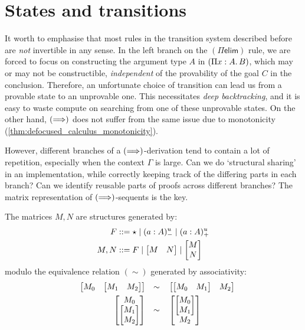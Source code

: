 \documentclass[twoside]{report}
\begin{document}
\section{States and transitions}
\label{sec:matrix_states_and_transitions}

It worth to emphasise that most rules in the transition system described before are \emph{not} invertible in any sense. In the left branch on the $(\Pi\mathsf{elim})$ rule, we are forced to focus on constructing the argument type $A$ in $(\Pi{x} : {A}.\,{B})$, which may or may not be constructible, \emph{independent} of the provability of the goal $C$ in the conclusion. Therefore, an unfortunate choice of transition can lead us from a provable state to an unprovable one. This necessitates \emph{deep backtracking}, and it is easy to waste compute on searching from one of these unprovable states. On the other hand, $(\Longrightarrow)$ does not suffer from the same issue due to monotonicity (\cref{thm:defocused_calculus_monotonicity}).

However, different branches of a $(\Longrightarrow)$-derivation tend to contain a lot of repetition, especially when the context $\Gamma$ is large. Can we do `structural sharing' in an implementation, while correctly keeping track of the differing parts in each branch? Can we identify reusable parts of proofs across different branches? The matrix representation of $(\Longrightarrow)$-sequents is the key.

\begin{definition}[Matrices]
    \label{def:matrices}
    The matrices $M, N$ are structures generated by:
    $$
        \begin{aligned}
            F    & ::= \star \mid (a : A)^u_- \mid (a : A)^u_+ \\
            M, N & ::= F \mid \begin{bmatrix}M & N\end{bmatrix} \mid \begin{bmatrix}M \\ N\end{bmatrix}
        \end{aligned}
    $$
    modulo the equivalence relation $(\sim)$ generated by associativity:
    $$
        \begin{aligned}
             &  & \begin{bmatrix}M_0 & \begin{bmatrix}M_1 & M_2\end{bmatrix}\end{bmatrix}   &  & \sim &  &  & \begin{bmatrix}\begin{bmatrix}M_0 & M_1\end{bmatrix} & M_2\end{bmatrix}   \\
             &  & \begin{bmatrix}M_0 \\ \begin{bmatrix}M_1 \\ M_2\end{bmatrix}\end{bmatrix} &  & \sim &  &  & \begin{bmatrix}\begin{bmatrix}M_0 \\ M_1\end{bmatrix} \\ M_2\end{bmatrix} \\
        \end{aligned}
    $$
\end{definition}
\end{document}
